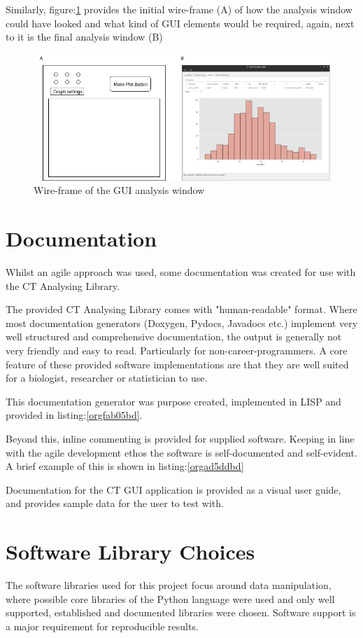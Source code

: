 \documentclass[11pt]{report}
\begin{document}
Similarly, figure:\ref{fig:org19f77db} provides the initial wire-frame (A) of how the analysis window could have looked and what kind of GUI elements would be required, again, next to it is the final analysis window (B)
\begin{figure}[htbp]
\centering
\includegraphics[width=16cm]{./images/wireframe2.png}
\caption{\label{fig:org19f77db}
Wire-frame of the GUI analysis window}
\end{figure}
\section{Documentation}
\label{sec:orgac72543}
Whilst an agile approach was used, some documentation was created for use with the CT Analysing Library.

The provided CT Analysing Library comes with "human-readable" format. Where most documentation generators (Doxygen, Pydocs, Javadocs etc.) implement very well structured and comprehensive documentation, the output is generally not very friendly and easy to read. Particularly for non-career-programmers. A core feature of these provided software implementations are that they are well suited for a biologist, researcher or statistician to use.

This documentation generator was purpose created, implemented in LISP and provided in listing:\ref{orgfab05bd}.

Beyond this, inline commenting is provided for supplied software. Keeping in line with the agile development ethos the software is self-documented and self-evident. A brief example of this is shown in listing:\ref{orgad5ddbd}

Documentation for the CT GUI application is provided as a visual user guide, and provides sample data for the user to test with.
\section{Software Library Choices}
\label{sec:org0341247}
The software libraries used for this project focus around data manipulation, where possible core libraries of the Python language were used and only well supported, established and documented libraries were chosen. Software support is a major requirement for reproducible results.
\end{document}
